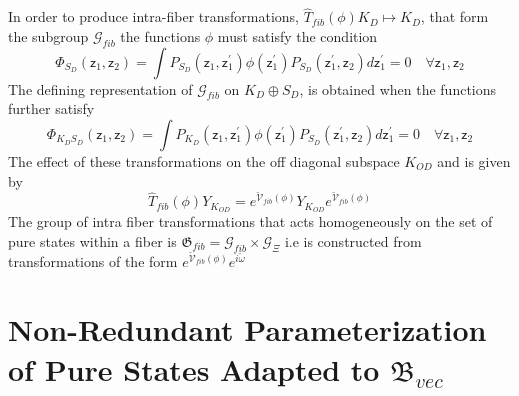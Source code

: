 \documentclass[aps,preprint]{revtex4}%
\begin{document}
In order to produce intra-fiber transformations, $\hat{T}_{fib}\left(
\phi\right)  K_{D}\mapsto K_{D}$, that form the subgroup $\mathcal{G}_{fib}$
the functions $\phi$ must satisfy the condition
\begin{equation}
\Phi_{S_{D}}\left(  \mathsf{z}_{1},\mathsf{z}_{2}\right)  =\int P_{S_{D}%
}\left(  \mathsf{z}_{1},\mathsf{z}_{1}^{\prime}\right)  \phi\left(
\mathsf{z}_{1}^{\prime}\right)  P_{S_{D}}\left(  \mathsf{z}_{1}^{\prime
},\mathsf{z}_{2}\right)  d\mathsf{z}_{1}^{\prime}=0\quad\forall\mathsf{z}%
_{1},\mathsf{z}_{2}%
\end{equation}
The defining representation of $\mathcal{G}_{fib}$ on $K_{D}\oplus S_{D}$, is
obtained when the functions further satisfy
\begin{equation}
\Phi_{K_{D}S_{D}}\left(  \mathsf{z}_{1},\mathsf{z}_{2}\right)  =\int P_{K_{D}%
}\left(  \mathsf{z}_{1},\mathsf{z}_{1}^{\prime}\right)  \phi\left(
\mathsf{z}_{1}^{\prime}\right)  P_{S_{D}}\left(  \mathsf{z}_{1}^{\prime
},\mathsf{z}_{2}\right)  d\mathsf{z}_{1}^{\prime}=0\quad\forall\mathsf{z}%
_{1},\mathsf{z}_{2}%
\end{equation}
The effect of these transformations on the off diagonal subspace $K_{OD}$ and
is given by
\begin{equation}
\hat{T}_{fib}\left(  \phi\right)  Y_{K_{OD}}=e^{\mathcal{\breve{V}}%
_{fib}\left(  \phi\right)  }Y_{K_{OD}}e^{\mathcal{\breve{V}}_{fib}\left(
\phi\right)  }%
\end{equation}
The group of intra fiber transformations that acts homogeneously on the set of
pure states within a fiber is $\mathfrak{G}_{fib}=\mathcal{G}_{fib}%
\times\mathcal{G}_{\Xi}$ i.e is constructed from transformations of the form
$e^{\mathcal{\breve{V}}_{fib}\left(  \phi\right)  }e^{i\breve{\omega}}$

\section{Non-Redundant Parameterization of Pure States Adapted to
$\mathfrak{B}_{vec}$}
\end{document}
